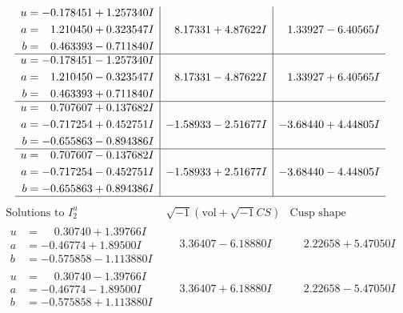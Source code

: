 \documentclass[1p]{elsarticle_modified}
\theoremstyle{definition}
\newcommand{\I}{\sqrt{-1}}
\begin{document}
$$\begin{array}{c|c|c}
\begin{aligned}
u &= -0.178451 + 1.257340 I \\
a &= \phantom{-}1.210450 + 0.323547 I \\
b &= \phantom{-}0.463393 - 0.711840 I\end{aligned}
 & \phantom{-}8.17331 + 4.87622 I & \phantom{-}1.33927 - 6.40565 I \\ \hline\begin{aligned}
u &= -0.178451 - 1.257340 I \\
a &= \phantom{-}1.210450 - 0.323547 I \\
b &= \phantom{-}0.463393 + 0.711840 I\end{aligned}
 & \phantom{-}8.17331 - 4.87622 I & \phantom{-}1.33927 + 6.40565 I \\ \hline\begin{aligned}
u &= \phantom{-}0.707607 + 0.137682 I \\
a &= -0.717254 + 0.452751 I \\
b &= -0.655863 - 0.894386 I\end{aligned}
 & -1.58933 - 2.51677 I & -3.68440 + 4.44805 I \\ \hline\begin{aligned}
u &= \phantom{-}0.707607 - 0.137682 I \\
a &= -0.717254 - 0.452751 I \\
b &= -0.655863 + 0.894386 I\end{aligned}
 & -1.58933 + 2.51677 I & -3.68440 - 4.44805 I\\
 \hline 
 \end{array}$$\newpage$$\begin{array}{c|c|c}  
\text{Solutions to }I^u_{2}& \I (\text{vol} + \sqrt{-1}CS) & \text{Cusp shape}\\
 \hline 
\begin{aligned}
u &= \phantom{-}0.30740 + 1.39766 I \\
a &= -0.46774 + 1.89500 I \\
b &= -0.575858 - 1.113880 I\end{aligned}
 & \phantom{-}3.36407 - 6.18880 I & \phantom{-}2.22658 + 5.47050 I \\ \hline\begin{aligned}
u &= \phantom{-}0.30740 - 1.39766 I \\
a &= -0.46774 - 1.89500 I \\
b &= -0.575858 + 1.113880 I\end{aligned}
 & \phantom{-}3.36407 + 6.18880 I & \phantom{-}2.22658 - 5.47050 I \\ \hline\begin{aligned}

\end{aligned}
\end{array}$$
\end{document}
